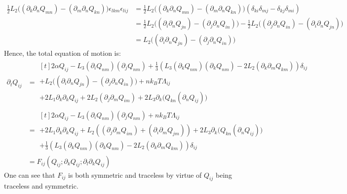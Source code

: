 \documentclass[reqno]{article}
\begin{document}
	\begin{equation}
	\begin{split}
		\tfrac12 L_2 \bigl( (\partial_k \partial_n Q_{mn}) - (\partial_m \partial_n Q_{kn} ) \bigr) \epsilon_{lkm} \epsilon_{lij}
		&= \tfrac12 L_2 \bigl( (\partial_k \partial_n Q_{mn}) - (\partial_m \partial_n Q_{kn} ) \bigr)
		\left( \delta_{ki} \delta_{mj} - \delta_{kj} \delta_{mi} \right) \\
		&= \tfrac12 L_2 \bigl( (\partial_i \partial_n Q_{jn}) - (\partial_j \partial_n Q_{in} ) \bigr)
		- \tfrac12 L_2 \bigl( (\partial_j \partial_n Q_{in}) - (\partial_i \partial_n Q_{jn} ) \bigr) \\
		&= L_2 \bigl( (\partial_i \partial_n Q_{jn}) - (\partial_j \partial_n Q_{in} ) \bigr)
	\end{split}
	\end{equation}
	Hence, the total equation of motion is:
	\begin{equation}
	\begin{split}
		\partial_t Q_{ij}
		&=
		\begin{multlined}[t]
		2 \alpha Q_{ij}
		- L_3 (\partial_i Q_{nm}) (\partial_j Q_{nm}) 
		+ \tfrac13 \left( L_3 (\partial_k Q_{nm})(\partial_k Q_{nm}) 
		- 2 L_2 (\partial_k \partial_m Q_{km}) \right) \delta_{ij} \\
		+ L_2 \bigl( (\partial_i \partial_n Q_{jn}) - (\partial_j \partial_n Q_{in} ) \bigr)
		+ n k_B T \Lambda_{ij} \\
		+ 2 L_1 \partial_k \partial_k Q_{ij} 
		+ 2 L_2 (\partial_j \partial_m Q_{im})
		+ 2 L_3 \partial_k \bigl( Q_{kn} (\partial_n Q_{ij}) \bigr)
		\end{multlined} \\
		&=
		\begin{multlined}[t]
		2 \alpha Q_{ij}
		- L_3 (\partial_i Q_{nm}) (\partial_j Q_{nm})
		+ n k_B T \Lambda_{ij} \\
		+ 2 L_1 \partial_k \partial_k Q_{ij} 
		+ L_2 \left( (\partial_j \partial_m Q_{im}) + (\partial_i \partial_m Q_{jm}) \right)
		+ 2 L_3 \partial_k \bigl( Q_{kn} (\partial_n Q_{ij}) \bigr) \\
		+ \tfrac13 \left( L_3 (\partial_k Q_{nm})(\partial_k Q_{nm}) 
		- 2 L_2 (\partial_k \partial_m Q_{km}) \right) \delta_{ij}
		\end{multlined} \\
		&= F_{ij} \left(Q_{ij} ; \partial_k Q_{ij} ; \partial_l \partial_k Q_{ij}\right)
	\end{split}
	\end{equation}
	One can see that $F_{ij}$ is both symmetric and traceless by virtue of $Q_{ij}$ being traceless and symmetric.
	
\end{document}
